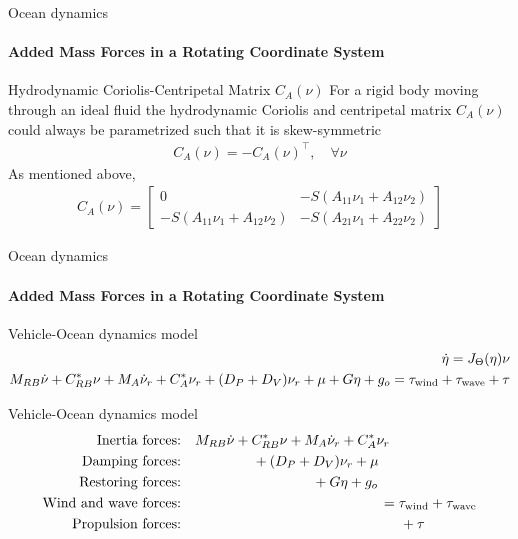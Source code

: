 \begin{frame}{Ocean dynamics}
	\framesubtitle{Added Mass Forces in a Rotating Coordinate System}
	\begin{block}{Hydrodynamic Coriolis-Centripetal Matrix $C_A(\nu)$}
		For a rigid body moving through an ideal fluid the hydrodynamic Coriolis and centripetal matrix $C_A(\nu)$ could always be parametrized such that it is skew-symmetric
		\begin{align}
			C_A(\nu) = -C_A(\nu)^\top, \quad \forall\nu
		\end{align}
		As mentioned above,
		\begin{align}
			C_A(\nu) = \begin{bmatrix}
				0 & -S(A_{11}\nu_1 + A_{12}\nu_2) \\
				-S(A_{11}\nu_1 + A_{12}\nu_2) & -S(A_{21}\nu_1 + A_{22}\nu_2) 
			\end{bmatrix}
		\end{align}
	\end{block}
\end{frame}




\begin{frame}{Ocean dynamics}
	\framesubtitle{Added Mass Forces in a Rotating Coordinate System}
	\begin{block}{Vehicle-Ocean dynamics model}
		\begin{align}
			\dot{\eta} = J_{\Theta}(\eta)\nu \notag \\
			M_{RB} \dot{\nu} + C_{RB}^* \nu + M_A \dot{\nu}_r + C_A^* \nu_r + (D_P + D_V) \nu_r + \mu + G \eta + g_o = \tau_{\text{wind}} + \tau_{\text{wave}}  + \tau  \notag
		\end{align}
	\end{block}
	\begin{block}{Vehicle-Ocean dynamics model}
		\begin{align}
			\text{Inertia forces:} & \quad M_{RB} \dot{\nu} + C_{RB}^* \nu + M_A \dot{\nu}_r + C_A^* \nu_r \notag\\
			\text{Damping forces:} & \hspace{1.8cm} + (D_P + D_V) \nu_r + \mu \notag\\
			\text{Restoring forces:} & \hspace{3.3cm} + G \eta + g_o \notag\\
			\text{Wind and wave forces:} & \hspace{5cm} = \tau_{\text{wind}} + \tau_{\text{wave}} \notag\\
			\text{Propulsion forces:} & \hspace{5.5cm} + \tau \notag
		\end{align}
	\end{block}
\end{frame}




